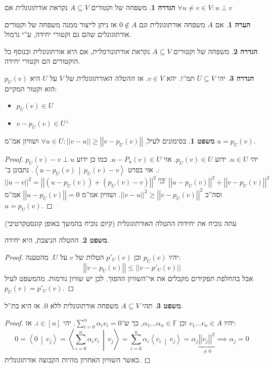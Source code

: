 \documentclass[a4paper]{article}
\newcommand\ra    {\rangle}
\newcommand\la    {\langle}
\newcommand\sumni     {\sum_{i = 0}^{n}}
\newcommand\F         {\mathbb{F}}
\newcommand\co        {\colon}
\newcommand\norm[1]   {\left \vert \left \vert #1 \right \vert \right \vert}
\newcommand\mut [2]   {\left \la #1 \,\middle\vert\, #2 \right \ra}
\newcommand\ag        {\alpha}
\theoremstyle{definition}
\newtheorem{Theorem}{\color{myblue}משפט}
\newtheorem{Definition}{\color{mygreen}הגדרה}
\newtheorem{Remark}{\color{mycyan}הערה}
\newcommand\theo  [1] {\begin{Theorem}#1\end{Theorem}}
\newcommand\defi  [1] {\begin{Definition}#1\end{Definition}}
\newcommand\rmark [1] {\begin{Remark}#1\end{Remark}}
\begin{document}
	\defi{משפחה של וקטורים $A \subseteq V$ נקראת \textit{אורתוגונלית} אם $\forall u \neq v \in V\co u \perp v$}
	\rmark{אם $A$ משפחה אורתוגונלית וגם $0 \notin A$ אז ניתן לייצור ממנה משפחה של וקטורים אורתוגונלים שהם גם וקטורי יחידה, ע''י נרמול. }
	\defi{משפחה של וקטורים $A \subseteq V$ נקראת \textit{אורתונורמלית}, אם היא אורתוגונלית ובנוסף כל הוקטורים הם וקטורי יחידה. }
	
	\defi{יהי $U \subseteq V$ תמ''ו. יהא $v \in V$. אז \textit{ההטלה האורתוגונלית} של $V$ על $U$ היא $p_U(v)$ הוא וקטור המקיים: 
		\begin{itemize}
			\item \hfil $p_U(v) \in U$ 
			\item \hfil $v - p_U(v) \in U^\perp$
	\end{itemize}}
	\theo{בסימונים לעיל, $\forall u \in U \co \norm{v - u} \ge \norm{v - p_U(v)}$ ושוויון אמ''מ $u = p_U(v)$. }
	
	\begin{proof}
		יהי $u \in U$. ידוע $p_U(v) \in U$. אזי $u - P_u(v) \in U$. כמו כן ידוע $p_U(v) - v \perp u$. אזי בפרט $\mut{u - p_U(v)}{p_U(v) - v}$. נתבונן ב־: 
		\[ \norm{u - v}^2 = \norm{(u - p_U(v)) + (p_U(v) - v)}^2 \overset{\text{פית'}}{=} \norm{u - p_U(v)}^2 + \norm{v - p_U(v)}^2 \]
		וסה''כ $\norm{v - u}^2 \ge \norm{v - p_U(v)}^2$. ושוויון אמ''מ $\norm{u- p_U(v)} = 0$ אמ''מ $u  = p_U(v)$. 
	\end{proof}
	עתה נוכיח את יחידות ההטלה האורתוגונלית (קיום נוכיח בהמשך באופן קונסטקרטיבי)
	\theo{ההטלה הניצבת, היא יחידה. }\begin{proof}
		יהיו $p_U(v)$ וכן $p'_U(v)$ הטלות של $v$ על $U$. מהטענה: 
		\[ \norm{v - p_U(v)} \le \norm{v - p'_U(v)} \]
		אבל בהחלפת תפקידים מקבלים את אי־השוויון ההפוך. לכן יש שוויון נורמות. מהמשפט לעיל $p_U(v) = p'_U(v)$. 
	\end{proof}
	
	\theo{תהי $A \subseteq V$ משפחה אורתוגונלית ללא $0$. אז היא בת''ל. }\begin{proof}
		יהיו $v_1 \dots v_n \in A$ וכן $\ag_1 \dots \ag_n \in \F$, כך ש־$\sumni \ag_i v_i = 0$. יהי $i \in [n]$. אז: 
		\[ 0 = \mut{0}{v_j} = \mut{\sumni \ag_i v_i}{v_j} = \sumni \ag_i \mut{v_i}{v_j} = \ag _j \underbrace{\norm{v_j}^2}_{\neq 0} \implies \ag_j = 0 \]
		כאשר השוויון האחרון מהיות הקבוצה אורתוגונלית. 
	\end{proof}
	
\end{document}
